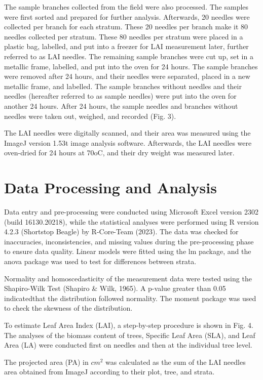 \documentclass[11pt, a4paper]{report}
\begin{document}
The sample branches collected from the field were also processed. The samples were first sorted and prepared for further analysis. Afterwards, 20 needles were collected per branch for each stratum. These 20 needles per branch make it 80 needles collected per stratum. These 80 needles per stratum were placed in a plastic bag, labelled, and put into a freezer for LAI measurement later, further referred to as LAI needles. The remaining sample branches were cut up, set in a metallic frame, labelled, and put into the oven for 24 hours. The sample branches were removed after 24 hours, and their needles were separated, placed in a new metallic frame, and labelled. The sample branches without needles and their needles (hereafter referred to as sample needles) were put into the oven for another 24 hours. After 24 hours, the sample needles and branches without needles were taken out, weighed, and recorded (Fig. 3). 

The LAI needles were digitally scanned, and their area was measured using the ImageJ version 1.53t image analysis software. Afterwards, the LAI needles were oven-dried for 24 hours at 70oC, and their dry weight was measured later.
\section{Data Processing and Analysis}
Data entry and pre-processing were conducted using Microsoft Excel version 2302 (build 16130.20218), while the statistical analyses were performed using R version 4.2.3 (Shortstop Beagle) by R-Core-Team (2023). The data was checked for inaccuracies, inconsistencies, and missing values during the pre-processing phase to ensure data quality. Linear models were fitted using the lm package, and the anova package was used to test for differences between strata. 

Normality and homoscedasticity of the measurement data were tested using the Shapiro-Wilk Test (Shapiro \& Wilk, 1965). A p-value greater than 0.05 indicatedthat the  distribution followed normality. The moment package was used to check the skewness of the distribution.

To estimate Leaf Area Index (LAI), a step-by-step procedure is shown in Fig. 4.
The analyses of the biomass content of trees, Specific Leaf Area (SLA), and Leaf Area (LA) were conducted first on needles and then at the individual tree level. 

The projected area (PA) in $cm^2$ was calculated as the sum of the LAI needles area obtained from ImageJ according to their plot, tree, and strata.
\end{document}
